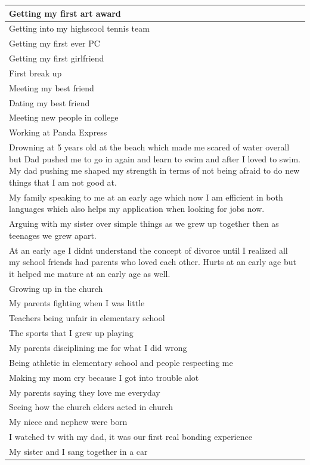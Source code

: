 \documentclass[
  .7em,
  letterpaper,
  DIV=11,
  numbers=noendperiod]{scrartcl}
\begin{document}
\begin{table}
\begin{tabular}{l}
\hline
Getting my first art award\\
\hline
Getting into my highscool tennis team\\
\hline
Getting my first ever PC\\
\hline
Getting my first girlfriend\\
\hline
First break up\\
\hline
Meeting my best friend\\
\hline
Dating my best friend\\
\hline
Meeting new people in college\\
\hline
Working at Panda Express\\
\hline
Drowning at 5 years old at the beach which made me scared of water overall but Dad pushed me to go in again and learn to swim and after I loved to swim. My dad pushing me shaped my strength in terms of not being afraid to do new things that I am not good at.\\
\hline
My family speaking to me at an early age which now I am efficient in both languages which also helps my application when looking for jobs now.\\
\hline
Arguing with my sister over simple things as we grew up together then as teenages we grew apart.\\
\hline
At an early age I didnt understand the concept of divorce until I realized all my school friends had parents who loved each other. Hurts at an early age but it helped me mature at an early age as well.\\
\hline
Growing up in the church\\
\hline
My parents fighting when I was little\\
\hline
Teachers being unfair in elementary school\\
\hline
The sports that I grew up playing\\
\hline
My parents disciplining me for what I did wrong\\
\hline
Being athletic in elementary school and people respecting me\\
\hline
Making my mom cry because I got into trouble alot\\
\hline
My parents saying they love me everyday\\
\hline
Seeing how the church elders acted in church\\
\hline
My niece and nephew were born\\
\hline
I watched tv with my dad, it was our first real bonding experience\\
\hline
My sister and I sang together in a car\\

\end{tabular}
\end{table}
\end{document}
